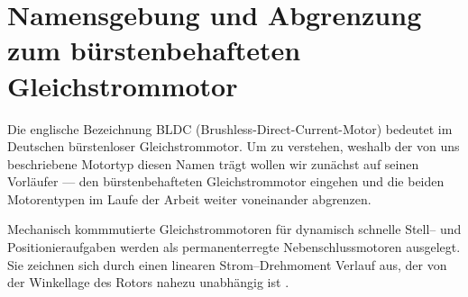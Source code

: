 \chapter{Namensgebung und Abgrenzung zum bürstenbehafteten Gleichstrommotor}

Die englische Bezeichnung \glqq{}BLDC\grqq{} (Brushless-Direct-Current-Motor) bedeutet im Deutschen \glqq{}bürstenloser Gleichstrommotor\grqq{}. Um zu verstehen, weshalb der von uns beschriebene Motortyp diesen Namen trägt wollen wir zunächst auf seinen Vorläufer --- den bürstenbehafteten Gleichstrommotor eingehen und die beiden Motorentypen im Laufe der Arbeit weiter voneinander abgrenzen.

\glqq{}Mechanisch  kommmutierte  Gleichstrommotoren  für  dynamisch  schnelle  Stell–  und  Positionieraufgaben werden als permanenterregte Nebenschlussmotoren ausgelegt. Sie zeichnen sich durch  einen  linearen  Strom–Drehmoment  Verlauf  aus,  der  von  der  Winkellage  des  Rotors  nahezu unabhängig ist\grqq{} \parencite[S.51]{Probst2011}.

